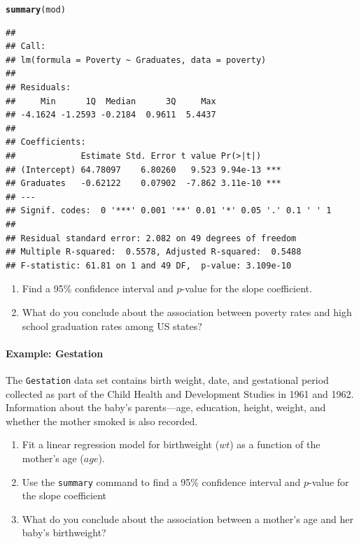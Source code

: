 \documentclass[10pt]{article}\usepackage[]{graphicx}\usepackage[]{color}
\makeatletter
\newcommand{\hlstd}[1]{\textcolor[rgb]{0.345,0.345,0.345}{#1}}%
\newcommand{\hlkwd}[1]{\textcolor[rgb]{0.737,0.353,0.396}{\textbf{#1}}}%
\newenvironment{kframe}{%
 \def\at@end@of@kframe{}%
 \ifinner\ifhmode%
  \def\at@end@of@kframe{\end{minipage}}%
  \begin{minipage}{\columnwidth}%
 \fi\fi%
 \def\FrameCommand##1{\hskip\@totalleftmargin \hskip-\fboxsep
 \colorbox{shadecolor}{##1}\hskip-\fboxsep
     \hskip-\linewidth \hskip-\@totalleftmargin \hskip\columnwidth}%
 \MakeFramed {\advance\hsize-\width
   \@totalleftmargin\z@ \linewidth\hsize
   \@setminipage}}%
 {\par\unskip\endMakeFramed%
 \at@end@of@kframe}
\newenvironment{knitrout}{}{} %
\makeatother
\begin{document}
\begin{knitrout}\footnotesize
{}\color{fgcolor}\begin{kframe}
\begin{alltt}
\hlkwd{summary}\hlstd{(mod)}
\end{alltt}
\begin{verbatim}
## 
## Call:
## lm(formula = Poverty ~ Graduates, data = poverty)
## 
## Residuals:
##     Min      1Q  Median      3Q     Max 
## -4.1624 -1.2593 -0.2184  0.9611  5.4437 
## 
## Coefficients:
##             Estimate Std. Error t value Pr(>|t|)    
## (Intercept) 64.78097    6.80260   9.523 9.94e-13 ***
## Graduates   -0.62122    0.07902  -7.862 3.11e-10 ***
## ---
## Signif. codes:  0 '***' 0.001 '**' 0.01 '*' 0.05 '.' 0.1 ' ' 1
## 
## Residual standard error: 2.082 on 49 degrees of freedom
## Multiple R-squared:  0.5578,	Adjusted R-squared:  0.5488 
## F-statistic: 61.81 on 1 and 49 DF,  p-value: 3.109e-10
\end{verbatim}
\end{kframe}
\end{knitrout}

\begin{enumerate}
  \itemsep0.5in
  \item Find a 95\% confidence interval and $p$-value for the slope coefficient.
  \item What do you conclude about the association between poverty rates and high school graduation rates among US states? 
  \vspace{0.5in}
\end{enumerate}


\paragraph{Example: Gestation}

The \texttt{Gestation} data set contains birth weight, date, and gestational period collected as part of the Child Health and Development Studies in 1961 and 1962. Information about the baby's parents---age, education, height, weight, and whether the mother smoked is also recorded.

\begin{enumerate}
  \itemsep1in
  \item Fit a linear regression model for birthweight ($wt$) as a function of the mother's age ($age$).
  \item Use the {\tt summary} command to find a 95\% confidence interval and $p$-value for the slope coefficient
  \item What do you conclude about the association between a mother's age and her baby's birthweight?
  \vspace{0.5in}
\end{enumerate}
\end{document}
